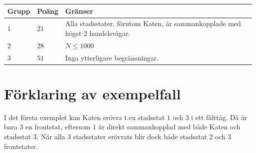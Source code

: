 \noindent
\begin{tabular}{| l | l | p{12cm} |}
  \hline
  \textbf{Grupp} & \textbf{Poäng} & \textbf{Gränser} \\ \hline
  $1$    & $21$      & Alla stadsstater, förutom Katen, är sammankopplade med högst $2$ handelsvägar. \\ \hline
  $2$    & $28$      & $N \le 1000$ \\ \hline
  $3$    & $51$      & Inga ytterligare begränsningar. \\ \hline
\end{tabular}

\section*{Förklaring av exempelfall}
I det första exemplet kan Katen erövra t.ex stadsstat $1$ och $3$ i ett fälttåg.
Då är bara $3$ en frontstat, eftersom $1$ är direkt sammankopplad med både Katen och stadsstat $3$.
När alla $3$ stadsstater erövrats blir dock både stadsstat $2$ och $3$ frontstater.
